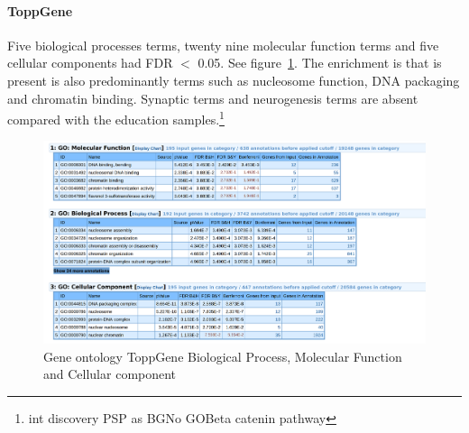 

\paragraph{ToppGene}
 
Five biological processes terms, twenty nine molecular function terms and five cellular components had FDR $<$ 0.05. See figure~\ref{fig:toppgene pic}. The enrichment is that is present is also predominantly terms such as nucleosome function, DNA packaging and chromatin binding. Synaptic terms and neurogenesis terms are absent compared with the education samples.\footnote{int discovery PSP as BGNo GOBeta catenin pathway} 

\begin{figure}
    \centering
    \includegraphics[width=\textwidth]{images/chapter2/strontium/images_toppgene_all_groups.png}
    \caption{Gene ontology ToppGene Biological Process, Molecular Function and Cellular component}
    \label{fig:toppgene pic}
\end{figure}







